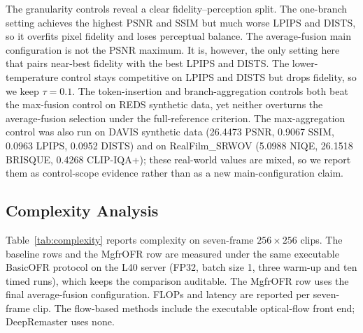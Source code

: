 The granularity controls reveal a clear fidelity--perception split. The one-branch setting achieves the highest PSNR and SSIM but much worse LPIPS and DISTS, so it overfits pixel fidelity and loses perceptual balance. The average-fusion main configuration is not the PSNR maximum. It is, however, the only setting here that pairs near-best fidelity with the best LPIPS and DISTS. The lower-temperature control stays competitive on LPIPS and DISTS but drops fidelity, so we keep $\tau=0.1$. The token-insertion and branch-aggregation controls both beat the max-fusion control on REDS synthetic data, yet neither overturns the average-fusion selection under the full-reference criterion. The max-aggregation control was also run on DAVIS synthetic data (26.4473 PSNR, 0.9067 SSIM, 0.0963 LPIPS, 0.0952 DISTS) and on RealFilm\_SRWOV (5.0988 NIQE, 26.1518 BRISQUE, 0.4268 CLIP-IQA+); these real-world values are mixed, so we report them as control-scope evidence rather than as a new main-configuration claim.

\FloatBarrier

\subsection{Complexity Analysis}
\label{subsec:complexity}

Table~\ref{tab:complexity} reports complexity on seven-frame $256{\times}256$ clips. The baseline rows and the MgfrOFR row are measured under the same executable BasicOFR protocol on the L40 server (FP32, batch size 1, three warm-up and ten timed runs), which keeps the comparison auditable. The MgfrOFR row uses the final average-fusion configuration. FLOPs and latency are reported per seven-frame clip. The flow-based methods include the executable optical-flow front end; DeepRemaster uses none.

